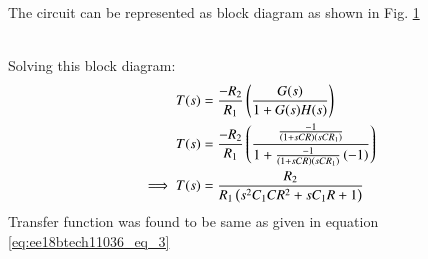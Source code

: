 \begin{enumerate}[label=\arabic*.,ref=\theenumi]
\begin{table}[!ht]
\centering

\caption{}
\label{table:ee18btech11036_ Output_Table}
\end{table}
 The circuit can be represented as block diagram as shown in Fig. \ref{fig:ee18btech11036_block_diag}
\begin{figure}[!hbt]
	\begin{center}
			\resizebox{\columnwidth}{!}{}
	\end{center}
\caption{}
\label{fig:ee18btech11036_block_diag}
\end{figure}
\renewcommand{\thefigure}{\theenumi}
\\
Solving this block diagram:
\begin{align}
    T(s) &= \frac{-R_2}{R_1}\left(\frac{G(s)}{1+G(s)H(s)}\right)
    \label{eq:ee18btech11036_eq_5}
    \\
    T(s) &= \frac{-R_2}{R_1}\left(\frac{\frac{-1}{\left(1+sCR\right)\left(sCR_1\right)}}{1+\frac{-1}{\left(1+sCR\right)\left(sCR_1\right)}\left(-1\right)}\right)
    \label{eq:ee18btech11036_eq_6}
    \\
    \implies T(s) &= \frac{R_2}{R_1\left(s^2C_1CR^2+sC_1R+1\right)} 
\end{align}
Transfer function was found to be same as given in equation \ref{eq:ee18btech11036_eq_3}


\end{enumerate}
